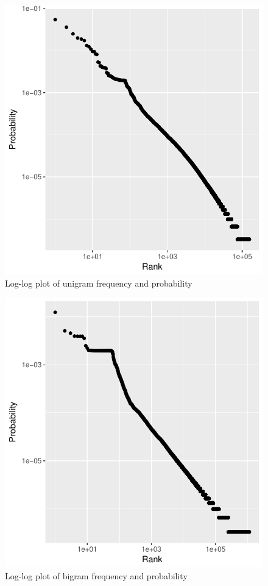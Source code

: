 \documentclass[letterpaper,11pt]{article}
\begin{document}
   \begin{figure}[h]
  \centering
  \includegraphics[scale=0.6]{unigram_plot.pdf}
  \caption{Log-log plot of unigram frequency and probability}
  \label{fig:q1p1}
  \end{figure}

   \begin{figure}[h]
  \centering
  \includegraphics[scale=0.6]{bigram.pdf}
  \caption{Log-log plot of bigram frequency and probability}
  \label{fig:q1p2}
  \end{figure}
  
\end{document}

